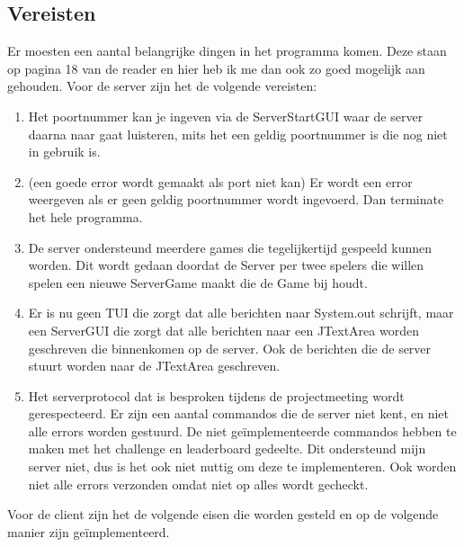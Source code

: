 \documentclass[12pt]{article}
\begin{document}
\subsection{Vereisten}
Er moesten een aantal belangrijke dingen in het programma komen. Deze staan op pagina 18 van de reader en hier heb ik me dan ook zo goed mogelijk aan gehouden.
Voor de server zijn het de volgende vereisten:
\begin{enumerate}
\item Het poortnummer kan je ingeven via de ServerStartGUI waar de server daarna naar gaat luisteren, mits het een geldig poortnummer is die nog niet in gebruik is.
\item (een goede error wordt gemaakt als port niet kan) Er wordt een error weergeven als er geen geldig poortnummer wordt ingevoerd. Dan terminate het hele programma. 
\item De server ondersteund meerdere games die tegelijkertijd gespeeld kunnen worden. Dit wordt gedaan doordat de Server per twee spelers die willen spelen een nieuwe ServerGame maakt die de Game bij houdt.
\item Er is nu geen TUI die zorgt dat alle berichten naar System.out schrijft, maar een ServerGUI die zorgt dat alle berichten naar een JTextArea worden geschreven die binnenkomen op de server. Ook de berichten die de server stuurt worden naar de JTextArea geschreven.
\item Het serverprotocol dat is besproken tijdens de projectmeeting wordt gerespecteerd. Er zijn een aantal commandos die de server niet kent, en niet alle errors worden gestuurd. De niet ge\"implementeerde commandos hebben te maken met het challenge en leaderboard gedeelte. Dit ondersteund mijn server niet, dus is het ook niet nuttig om deze te implementeren. Ook worden niet alle errors verzonden omdat niet op alles wordt gecheckt.
\end{enumerate}
Voor de client zijn het de volgende eisen die worden gesteld en op de volgende manier zijn ge\"implementeerd.
\end{document}
